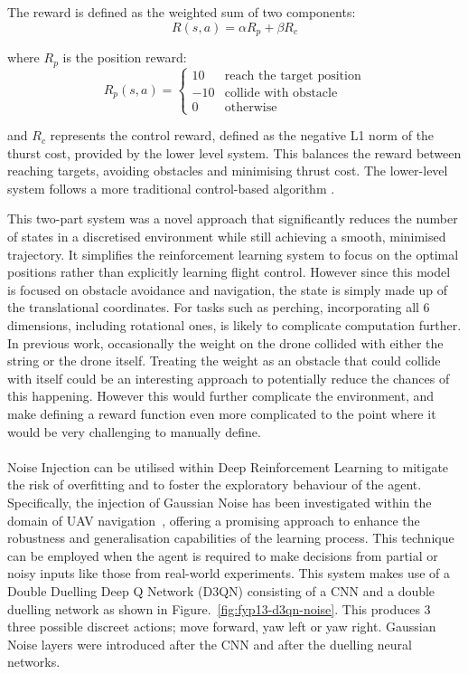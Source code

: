 The reward is defined as the weighted sum of two components:
\[R(s, a) = \alpha R_{p} + \beta R_{c}\]

where $R_{p}$ is the position reward:
\[
R_{p}(s, a) = 
\begin{cases} 
10 & \text{reach the target position} \\
-10 & \text{collide with obstacle} \\
0 & \text{otherwise}
\end{cases}
\]

and $R_{c}$ represents the control reward, defined as the negative L1 norm of the thurst cost, provided by the lower level system.
This balances the reward between reaching targets, avoiding obstacles and minimising thrust cost.
The lower-level system follows a more traditional control-based algorithm \cite{fyp12-waypoint-nav2}.

This two-part system was a novel approach that significantly reduces the number of states in a discretised environment while still achieving a smooth, minimised trajectory.
It simplifies the reinforcement learning system to focus on the optimal positions rather than explicitly learning flight control.
However since this model is focused on obstacle avoidance and navigation, the state is simply made up of the translational coordinates.
For tasks such as perching, incorporating all 6 dimensions, including rotational ones, is likely to complicate computation further.
In previous work, occasionally the weight on the drone collided with either the string or the drone itself.
Treating the weight as an obstacle that could collide with itself could be an interesting approach to potentially reduce the chances of this happening.
However this would further complicate the environment, and make defining a reward function even more complicated to the point where it would be very challenging to manually define. \\\\

Noise Injection can be utilised within Deep Reinforcement Learning to mitigate the risk of overfitting and to foster the exploratory behaviour of the agent.
Specifically, the injection of Gaussian Noise has been investigated within the domain of UAV navigation~\cite{fyp13-noise-injection}, offering a promising approach to enhance the robustness and generalisation capabilities of the learning process.
This technique can be employed when the agent is required to make decisions from partial or noisy inputs like those from real-world experiments.
This system makes use of a Double Duelling Deep Q Network (D3QN) consisting of a CNN and a double duelling network as shown in Figure.~\ref{fig:fyp13-d3qn-noise}.
This produces 3 three possible discreet actions; move forward, yaw left or yaw right.
Gaussian Noise layers were introduced after the CNN and after the duelling neural networks.

